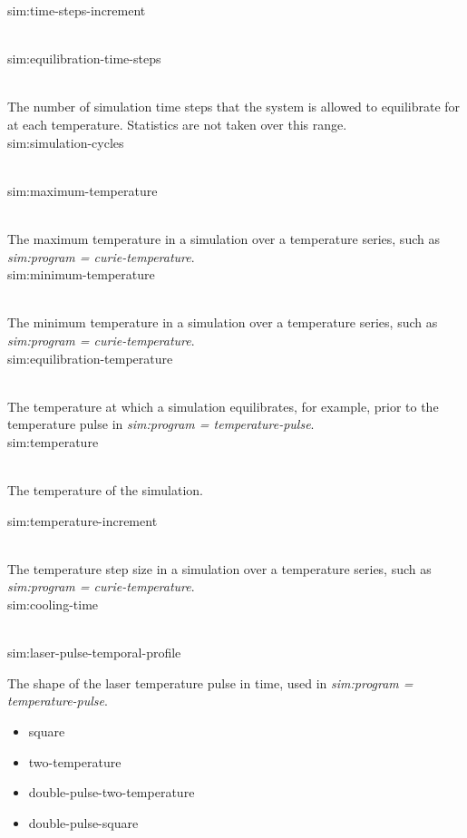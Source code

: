 {\zicf sim:time-steps-increment}\\

{\zicf sim:equilibration-time-steps}\\
   The number of simulation time steps that the system is allowed to equilibrate for at each temperature. Statistics are not taken over this range.\\
{\zicf sim:simulation-cycles}\\

{\zicf sim:maximum-temperature}\\
   The maximum temperature in a simulation over a temperature series, such as \textit{sim:program = curie-temperature}.\\

{\zicf sim:minimum-temperature}\\
   The minimum temperature in a simulation over a temperature series, such as \textit{sim:program = curie-temperature}.\\

{\zicf sim:equilibration-temperature}\\
   The temperature at which a simulation equilibrates, for example, prior to the temperature pulse in \textit{sim:program = temperature-pulse}.\\
{\zicf sim:temperature}\\
   The temperature of the simulation.

{\zicf sim:temperature-increment}\\
   The temperature step size in a simulation over a temperature series, such as \textit{sim:program = curie-temperature}.\\

{\zicf sim:cooling-time}\\

{\zicf sim:laser-pulse-temporal-profile}
   The shape of the laser temperature pulse in time, used in \textit{sim:program = temperature-pulse}.\\
  \begin{itemize}
    \item[] square
    \item[] two-temperature
    \item[] double-pulse-two-temperature
    \item[] double-pulse-square\\
  \end{itemize}

